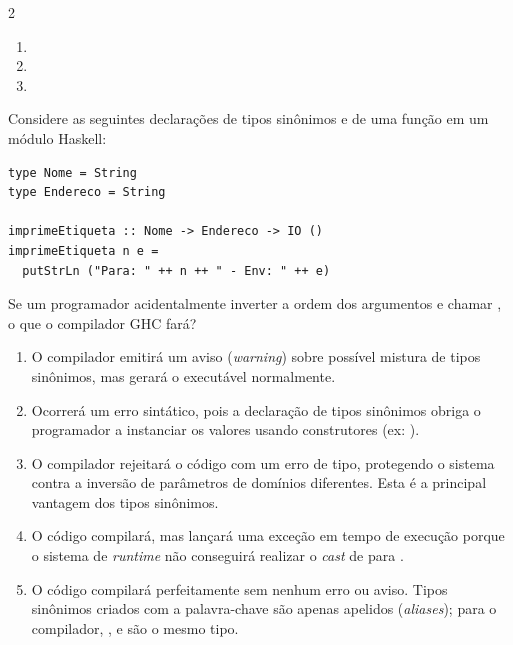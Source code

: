 \documentclass[a4paper,10pt,brazil]{article}
\begin{document}
\begin{multicols}{2}
\begin{enumerate}
  \item {}

  \item {}

  \item {}


\end{enumerate}

Considere as seguintes declarações de tipos sinônimos e de uma função em um módulo Haskell:

\begin{verbatim}
type Nome = String
type Endereco = String

imprimeEtiqueta :: Nome -> Endereco -> IO ()
imprimeEtiqueta n e =
  putStrLn ("Para: " ++ n ++ " - Env: " ++ e)
\end{verbatim}

Se um programador acidentalmente inverter a ordem dos argumentos e chamar , o que o compilador GHC fará?

\begin{enumerate}
  \item O compilador emitirá um aviso (\emph{warning}) sobre possível mistura de tipos sinônimos, mas gerará o executável normalmente.

  \item Ocorrerá um erro sintático, pois a declaração de tipos sinônimos obriga o programador a instanciar os valores usando construtores (ex: ).

  \item O compilador rejeitará o código com um erro de tipo, protegendo o sistema contra a inversão de parâmetros de domínios diferentes. Esta é a principal vantagem dos tipos sinônimos.

  \item O código compilará, mas lançará uma exceção em tempo de execução porque o sistema de \emph{runtime} não conseguirá realizar o \emph{cast} de  para .

  \item O código compilará perfeitamente sem nenhum erro ou aviso. Tipos sinônimos criados com a palavra-chave  são apenas apelidos (\emph{aliases}); para o compilador, ,  e  são o mesmo tipo.


\end{enumerate}


\end{multicols}
\end{document}
